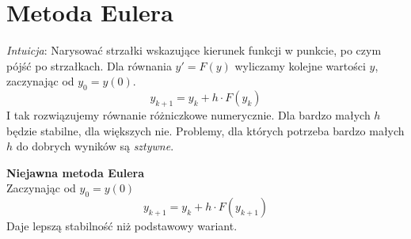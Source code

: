\section{Metoda Eulera}
\textit{Intuicja}: Narysować strzałki wskazujące kierunek funkcji w punkcie, po czym pójść po strzałkach. Dla równania \( y' = F(y) \) wyliczamy kolejne wartości \( y \), zaczynając od \( y_0 = y(0) \).
\[
    y_{k+1} = y_k + h \cdot F(y_k)
\]
I tak rozwiązujemy równanie różniczkowe numerycznie. Dla bardzo małych \( h \) będzie stabilne, dla większych nie. Problemy, dla których potrzeba bardzo małych \( h \) do dobrych wyników są \textit{sztywne}.

\noindent
\textbf{Niejawna metoda Eulera} \\
Zaczynając od \( y_0 = y(0) \)
\[
    y_{k+1} = y_k + h \cdot F(y_{k+1})
\]
Daje lepszą stabilność niż podstawowy wariant.